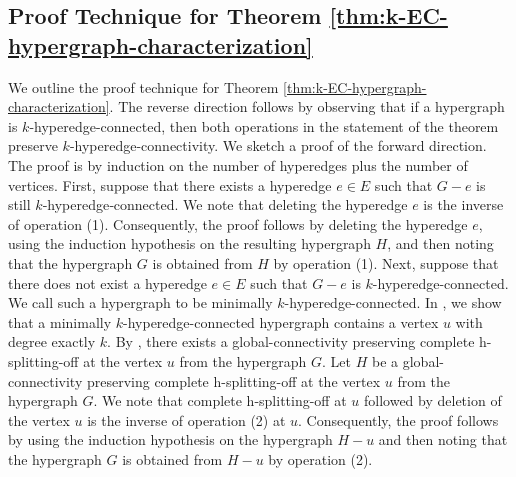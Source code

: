 
\subsection{Proof Technique for Theorem \ref{thm:k-EC-hypergraph-characterization}}
We outline the proof technique for Theorem \ref{thm:k-EC-hypergraph-characterization}. The reverse direction follows by observing that if a hypergraph is $k$-hyperedge-connected, then both operations in the statement of the theorem preserve $k$-hyperedge-connectivity. We sketch a proof of the forward direction. 
The proof is by induction on the number of hyperedges plus the number of vertices. 
First, suppose that there exists a hyperedge $e \in E$ such that $G - e$ is still $k$‐hyperedge‐connected. We note that deleting the hyperedge $e$ is the inverse of operation (1). Consequently, the proof follows by deleting the hyperedge $e$, using the induction hypothesis on the resulting hypergraph $H$, and then noting that the hypergraph $G$ is obtained from $H$ by operation (1). 
Next, suppose that there does not exist a hyperedge $e \in E$ such that $G-e$ is $k$-hyperedge-connected. We call such a hypergraph to be minimally $k$-hyperedge-connected. In , we show that a minimally $k$-hyperedge-connected hypergraph contains a vertex $u$ with degree exactly $k$. By , there exists a global-connectivity preserving complete h-splitting-off at the vertex $u$ from the hypergraph $G$. Let $H$ be a global-connectivity preserving complete h-splitting-off at the vertex $u$ from the hypergraph $G$. 
We note that complete h-splitting-off at $u$ followed by deletion of the vertex $u$ is the inverse of operation (2) at $u$. 
Consequently, the proof follows by using the induction hypothesis on the hypergraph $H-u$ and then noting that the hypergraph $G$ is obtained from $H-u$ by operation (2).



